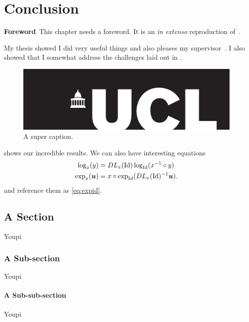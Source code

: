 \chapter{Conclusion}
\label{chap:conclusion}
\minitoc

\begin{center}
\begin{minipage}[b]{0.9\linewidth}
\small
\textbf{Foreword\,}
This chapter needs a foreword. It is an \emph{in extenso} reproduction of~\cite{Ourselin:MICCAI:00}.
\end{minipage}
\end{center}


My thesis showed I did very useful things and also pleases my supervisor~\cite{Ourselin:MICCAI:00}. I also showed that I somewhat address the challenges laid out in .

\begin{figure}[htb!]
\centering
\includegraphics[width=0.60\linewidth]{figs/University_College_London_logo}
\caption{A super caption.\label{fig:logo}}
\end{figure}

 shows our incredible results. We can also have interesting equations
\begin{align}
\log_x(y) &= DL_x(\operatorname{Id}) \log_{\operatorname{Id}}(x^{-1} \circ y) \label{eq:logid}\\
\exp_{x}(\boldsymbol{u}) &= x \circ \exp_{\operatorname{Id}}( DL_x(\operatorname{Id})^{-1} \boldsymbol{u} ).
\label{eq:expid}
\end{align}
and reference them as \eqref{eq:expid}.

\section{A Section}
%
Youpi

\subsection{A Sub-section}
%
Youpi

\subsubsection{A Sub-sub-section}
%
Youpi

